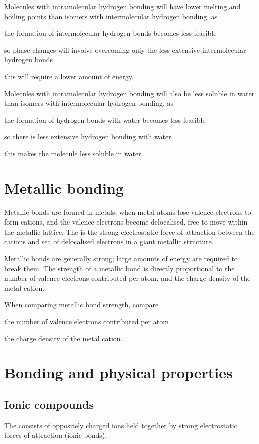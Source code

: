 \documentclass[Chemistry.tex]{subfiles}
\begin{document}
Molecules with intramolecular hydrogen bonding will have lower melting and boiling points than isomers with intermolecular hydrogen bonding, as \begin{slinenum}
\item the formation of intermolecular hydrogen bonds becomes less feasible
\item so phase changes will involve overcoming only the less extensive intermolecular hydrogen bonds
\item this will require a lower amount of energy.\end{slinenum}

Molecules with intramolecular hydrogen bonding will also be less soluble in water than isomers with intermolecular hydrogen bonding, as \begin{slinenum}
\item the formation of hydrogen bonds with water becomes less feasible
\item so there is less extensive hydrogen bonding with water
\item this makes the molecule less soluble in water.\end{slinenum}
\section{Metallic bonding}
Metallic bonds are formed in metals, when metal atoms lose valence electrons to form cations, and the valence electrons become delocalised, free to move within the metallic lattice. The  is the strong electrostatic force of attraction between the cations and sea of delocalised electrons in a giant metallic structure.

Metallic bonds are generally strong; large amounts of energy are required to break them. The strength of a metallic bond is directly proportional to the number of valence electrons contributed per atom, and the charge density of the metal cation.

When comparing metallic bond strength, compare \begin{slinenum}\item the number of valence electrons contributed per atom \item the charge density of the metal cation.\end{slinenum} \section{Bonding and physical properties}
\subsection{Ionic compounds}
The  consists of oppositely charged ions held together by strong electrostatic forces of attraction (ionic bonds).
\end{document}
